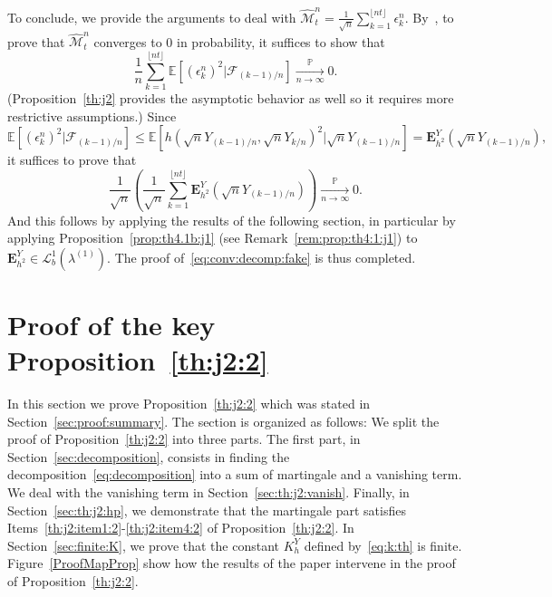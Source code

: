 \documentclass[12pt]{article}
\numberwithin{equation}{section}
\theoremstyle{definition}
\theoremstyle{remark}
\newcommand{\convp}[1][]{\xrightarrow[#1]{\PP}}
\newcommand{\PP}{\mathbb{P}}
\newcommand{\EE}{\mathbb{E}}
\newcommand{\cF}{\mathcal{F}}
\newcommand{\Lgb}[1]{\mathcal{L}^{1}_{b}(\lambda^{(#1)})}
\newcommand{\bfH}[1]{\mathbf{E}^Y_{#1}}
\begin{document}
To conclude, we provide the arguments to deal with 
$	
	\widehat{\mathcal{M}}^n_t = \frac{1}{\sqrt{n}} \sum_{k=1}^{\lfloor n t \rfloor} \epsilon^n_k
$. 
By~\cite[Lemma~9]{GCJ93}, to prove that $\widehat{\mathcal{M}}^n_t$
converges to 0 in probability, it suffices to show that 
\begin{equation}
	\frac1n \sum_{k=1}^{\lfloor n t \rfloor} \EE\!\left[ (\epsilon^n_k)^2 | \cF_{(k-1)/n}\right] \convp[n\to\infty] 0.
\end{equation}
(Proposition~\ref{th:j2} provides the asymptotic behavior as well so it requires more restrictive assumptions.)
Since
\[
	\EE\!\left[ (\epsilon^n_k)^2 | \cF_{(k-1)/n}\right] 
	\leq 
	\EE\!\left[h(\sqrt{n}Y_{(k-1)/n},\sqrt{n}Y_{k/n})^2 | \sqrt{n}Y_{(k-1)/n}\right] 
	= %
	\bfH{h^2} (\sqrt{n}Y_{(k-1)/n}),
\]
it suffices to prove that 
\begin{equation}
	 \frac1{\sqrt n} \left( \frac1{\sqrt n} \sum_{k=1}^{\lfloor n t \rfloor} \bfH{h^2} (\sqrt{n}Y_{(k-1)/n}) \right) 
\convp[n\to\infty] 0.
\end{equation}
%
And this follows by applying the results of the following section, in particular by applying Proposition~\ref{prop:th4.1b:j1} (see Remark~\ref{rem:prop:th4:1:j1}) to $\bfH{h^2} \in \Lgb{1}$. 
The proof of~\eqref{eq:conv:decomp:fake} is thus completed.






\section{Proof of the key Proposition~\ref{th:j2:2}} \label{sec:proof:j1}

In this section we prove Proposition~\ref{th:j2:2} which was stated in Section~\ref{sec:proof:summary}.
The section is organized as follows: We split the proof of Proposition~\ref{th:j2:2} into three parts. The first part, in Section~\ref{sec:decomposition}, consists in finding the decomposition~\eqref{eq:decomposition} into a sum of martingale and a vanishing term. 
We deal with the vanishing term in Section~\ref{sec:th:j2:vanish}. Finally, in Section~\ref{sec:th:j2:hp}, we demonstrate that the martingale part satisfies Items~\ref{th:j2:item1:2}-\ref{th:j2:item4:2} of Proposition~\ref{th:j2:2}.
In Section~\ref{sec:finite:K}, we prove that the constant $K_h^Y$ defined by~\eqref{eq:k:th} is finite.
Figure~\ref{ProofMapProp} show how the results of the paper intervene in the proof of Proposition~\ref{th:j2:2}.
\end{document}
